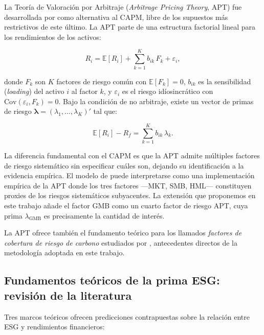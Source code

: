 \documentclass[12pt, a4paper]{article}
\begin{document}
La Teor\'ia de Valoraci\'on por Arbitraje (\textit{Arbitrage Pricing Theory}, APT)
fue desarrollada por \textcite{ross1976} como alternativa al CAPM, libre de los
supuestos m\'as restrictivos de este \'ultimo. La APT parte de una estructura factorial
lineal para los rendimientos de los activos:

\begin{equation}
  \label{eq:apt}
  R_i = \mathbb{E}[R_i] + \sum_{k=1}^{K} b_{ik}\,F_k + \varepsilon_i,
\end{equation}

donde $F_k$ son $K$ factores de riesgo com\'un con $\mathbb{E}[F_k] = 0$,
$b_{ik}$ es la sensibilidad (\textit{loading}) del activo $i$ al factor $k$, y
$\varepsilon_i$ es el riesgo id\'iosincrático con $\mathrm{Cov}(\varepsilon_i, F_k)=0$.
Bajo la condici\'on de no arbitraje, existe un vector de primas de riesgo
$\boldsymbol{\lambda} = (\lambda_1, \ldots, \lambda_K)'$ tal que:

\begin{equation}
  \label{eq:apt_premium}
  \mathbb{E}[R_i] - R_f = \sum_{k=1}^{K} b_{ik}\,\lambda_k.
\end{equation}

La diferencia fundamental con el CAPM es que la APT admite m\'ultiples factores de
riesgo sistem\'atico sin especificar cu\'ales son, dejando su identificaci\'on a la
evidencia emp\'irica. El modelo de \textcite{famafrench1993} puede interpretarse como
una implementaci\'on emp\'irica de la APT donde los tres factores ---MKT, SMB, HML---
constituyen proxies de los riesgos sistem\'aticos subyacentes. La extensi\'on que
proponemos en este trabajo a\~nade el factor GMB como un cuarto factor de riesgo APT,
cuya prima $\lambda_{\mathrm{GMB}}$ es precisamente la cantidad de inter\'es.

La APT ofrece tambi\'en el fundamento te\'orico para los llamados \textit{factores
de cobertura de riesgo de carbono} estudiados por \textcite{gorgen2020}, antecedentes
directos de la metodolog\'ia adoptada en este trabajo.

\subsection{Fundamentos te\'oricos de la prima ESG: revisi\'on de la literatura}
\label{subsec:teoria_esg}

Tres marcos te\'oricos ofrecen predicciones contrapuestas sobre la relaci\'on entre ESG
y rendimientos financieros:
\end{document}
